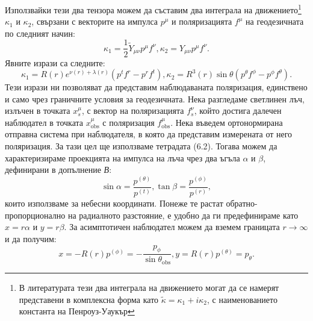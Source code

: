 Използвайки тези два тензора можем да съставим два интеграла на движението\footnote{В литературата тези два интеграла на движението могат да се намерят представени в комплексна форма като $\tilde{\kappa} = \kappa_1 + i\kappa_2$, с наименованието константа на Пенроуз-Уаукър} $\kappa_1$ и $\kappa_2$, свързани с векторите на импулса $p^\mu$ и поляризацията $f^\mu$ на геодезичната по следният начин:
\begin{subequations}
	\begin{equation}
		\kappa_1 = \frac{1}{2}\tilde{Y}_{\mu\nu}p^\mu f^\nu,
	\end{equation}
	\begin{equation}
		\kappa_2 = Y_{\mu\nu}p^\mu f^\nu.
	\end{equation}
\end{subequations}
Явните изрази са следните:
\begin{subequations}
	\begin{equation}
		\kappa_1 = R(r)e^{\nu(r) + \lambda(r)}\left( p^tf^r - p^rf^t \right),
	\end{equation}
	\begin{equation}
		\kappa_2 = R^3(r)\sin\theta\left(p^\theta f^\phi - p^\phi f^\theta\right).
	\end{equation}
\end{subequations}
Тези изрази ни позволяват да представим наблюдаваната поляризация, единствено и само чрез граничните условия за геодезичната. Нека разгледаме светлинен лъч, излъчен в точката $x^\mu_s$, с вектор на поляризацията $f^\nu_s$, който достига далечен наблюдател в точката $x^\mu_{\text{obs}}$ с поляризация $f^\mu_{\text{obs}}$. Нека въведем ортонормирана отправна система при наблюдателя, в която да представим измерената от него поляризация. За тази цел ще използваме тетрадата (6.2). Тогава можем да характеризираме проекцията на импулса на лъча чрез два ъгъла $\alpha$ и $\beta$, дефинирани в допълнение \emph{В}:
\begin{subequations}
	\begin{equation}
	\sin\alpha = \frac{p^{(\theta)}}{p^{(t)}},
	\end{equation}
	\begin{equation}
		\tan\beta = \frac{p^{(\phi)}}{p^{(r)}},
	\end{equation}
\end{subequations}
които използваме за небесни координати. Понеже те растат обратно-пропорционално на радиалното разстояние, е удобно да ги предефинираме като $x = r\alpha$ и $y = r\beta$. За асимптотичен наблюдател можем да вземем границата $r\rightarrow\infty$ и да получим:
\begin{subequations}
	\begin{equation}
		x = -R(r)p^{(\phi)} = -\frac{p_\phi}{\sin\theta_\text{obs}},
	\end{equation}
	\begin{equation}
		y = R(r)p^{(\theta)} = p_\theta.
	\end{equation}
\end{subequations}

